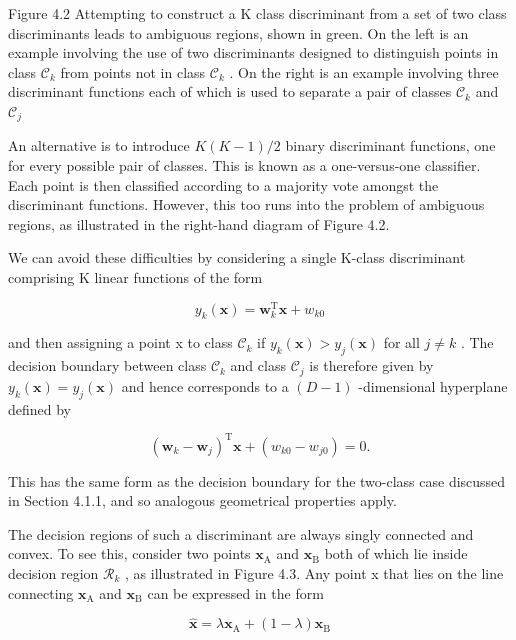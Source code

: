 \documentclass[
  10
]{article}
\begin{document}
Figure 4.2 Attempting to construct a K class discriminant from a set of
two class discriminants leads to ambiguous regions, shown in green. On
the left is an example involving the use of two discriminants designed
to distinguish points in class \(\mathcal { C } _ { k }\) from points
not in class \(\mathcal { C } _ { k }\) . On the right is an example
involving three discriminant functions each of which is used to separate
a pair of classes \(\mathcal { C } _ { k }\) and
\(\mathcal { C } _ { j }\)

An alternative is to introduce \(K ( K - 1 ) / 2\) binary discriminant
functions, one for every possible pair of classes. This is known as a
one-versus-one classifier. Each point is then classified according to a
majority vote amongst the discriminant functions. However, this too runs
into the problem of ambiguous regions, as illustrated in the right-hand
diagram of Figure 4.2.

We can avoid these difficulties by considering a single K-class
discriminant comprising K linear functions of the form

\[
y _ {k} (\mathbf {x}) = \mathbf {w} _ {k} ^ {\mathrm{T}} \mathbf {x} + w _ {k 0}\tag{4.9}
\]

and then assigning a point x to class \(\mathcal { C } _ { k }\) if
\(y _ { k } ( \mathbf x ) > y _ { j } ( \mathbf x )\) for all
\(j \neq k\) . The decision boundary between class
\(\mathcal { C } _ { k }\) and class \(\mathcal { C } _ { j }\) is
therefore given by \(y _ { k } ( \mathbf x ) = y _ { j } ( \mathbf x )\)
and hence corresponds to a \(( D - 1 )\) -dimensional hyperplane defined
by

\[
\left(\mathbf {w} _ {k} - \mathbf {w} _ {j}\right) ^ {\mathrm{T}} \mathbf {x} + \left(w _ {k 0} - w _ {j 0}\right) = 0.\tag{4.10}
\]

This has the same form as the decision boundary for the two-class case
discussed in Section 4.1.1, and so analogous geometrical properties
apply.

The decision regions of such a discriminant are always singly connected
and convex. To see this, consider two points
\(\mathbf { x } _ { \mathrm { A } }\) and
\(\mathbf { x _ { \mathrm { B } } }\) both of which lie inside decision
region \(\mathcal { R } _ { k }\) , as illustrated in Figure 4.3. Any
point x that lies on the line connecting
\(\mathbf { x } _ { \mathrm { A } }\) and
\(\mathbf { x } _ { \mathrm { B } }\) can be expressed in the form

\[
\widehat {\mathbf {x}} = \lambda \mathbf {x} _ {\mathrm{A}} + (1 - \lambda) \mathbf {x} _ {\mathrm{B}}\tag{4.11}
\]
\end{document}
